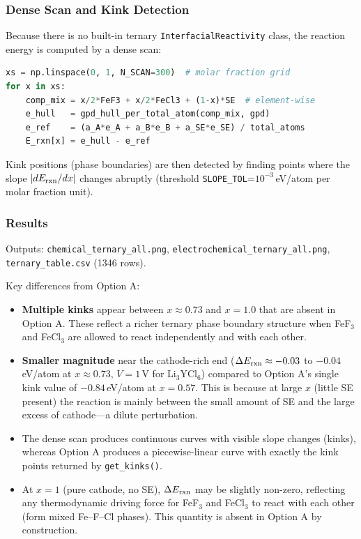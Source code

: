 \documentclass[11pt,letterpaper]{article}
\begin{document}
\subsubsection{Dense Scan and Kink Detection}

Because there is no built-in ternary \texttt{InterfacialReactivity} class,
the reaction energy is computed by a dense scan:
\begin{lstlisting}[language=Python]
xs = np.linspace(0, 1, N_SCAN=300)  # molar fraction grid
for x in xs:
    comp_mix = x/2*FeF3 + x/2*FeCl3 + (1-x)*SE  # element-wise
    e_hull   = gpd_hull_per_total_atom(comp_mix, gpd)
    e_ref    = (a_A*e_A + a_B*e_B + a_SE*e_SE) / total_atoms
    E_rxn[x] = e_hull - e_ref
\end{lstlisting}
Kink positions (phase boundaries) are then detected by finding points
where the slope $|dE_{\rm rxn}/dx|$ changes abruptly
(threshold \texttt{SLOPE\_TOL}=$10^{-3}$\,eV/atom per molar fraction unit).

\subsubsection{Results}

Outputs: \texttt{chemical\_ternary\_all.png},
\texttt{electrochemical\_ternary\_all.png},
\texttt{ternary\_table.csv} (1346 rows).

Key differences from Option A:
\begin{itemize}
  \item \textbf{Multiple kinks} appear between $x \approx 0.73$ and
        $x = 1.0$ that are absent in Option A. These reflect a richer
        ternary phase boundary structure when FeF$_3$ and FeCl$_3$ are
        allowed to react independently and with each other.
  \item \textbf{Smaller magnitude} near the cathode-rich end
        ($\Delta E_{\rm rxn} \approx -0.03$ to $-0.04$\,eV/atom at
        $x \approx 0.73$, $V=1$\,V for Li$_3$YCl$_6$) compared to
        Option A's single kink value of $-0.84$\,eV/atom at $x=0.57$.
        This is because at large $x$ (little SE present) the reaction
        is mainly between the small amount of SE and the large excess
        of cathode---a dilute perturbation.
  \item The dense scan produces continuous curves with visible slope
        changes (kinks), whereas Option A produces a piecewise-linear
        curve with exactly the kink points returned by
        \texttt{get\_kinks()}.
  \item At $x=1$ (pure cathode, no SE), $\Delta E_{\rm rxn}$ may be
        slightly non-zero, reflecting any thermodynamic driving force
        for FeF$_3$ and FeCl$_3$ to react with each other (form mixed
        Fe--F--Cl phases). This quantity is absent in Option A by
        construction.
\end{itemize}
\end{document}
